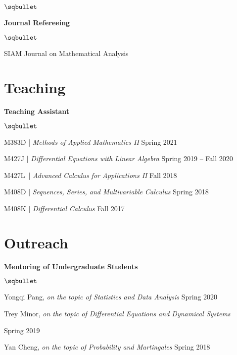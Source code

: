 \documentclass[margin,line]{res}
\newenvironment{list2}{
  \begin{list}{$\sqbullet$}{%
      \setlength{\itemsep}{0.05in}
      \setlength{\parsep}{0in} 
      \setlength{\parskip}{0in}
      \setlength{\topsep}{0.1in} 
      \setlength{\partopsep}{-0.07in} 
      \setlength{\leftmargin}{0.15in}
    }}
{\end{list}}
\begin{document}
\begin{resume}
\begin{list2}
\end{list2}
 
{\bf Journal Refereeing}

\begin{list2}
    \item SIAM Journal on Mathematical Analysis
\end{list2}

\section{\sc Teaching}

{\bf Teaching Assistant}

\begin{list2}
    
    \item M383D \hspace{0.005in}| \textit{Methods of Applied Mathematics II} \hfill Spring 2021
    
    \item M427J \hspace{0.04in}| \textit{Differential Equations with Linear Algebra} \hfill Spring 2019 -- Fall 2020
    
    \item M427L \,| \textit{Advanced Calculus for Applications II} \hfill Fall 2018
    
    \item M408D \hspace{0.002in}| \textit{Sequences, Series, and Multivariable Calculus} \hfill Spring 2018
    
    \item M408K | \textit{Differential Calculus} \hfill Fall 2017
    
\end{list2}

\section{\sc Outreach}

{\bf Mentoring of Undergraduate Students}


\begin{list2}

    \item Yongqi Pang, \textit{on the topic of Statistics and Data Analysis} \hfill Spring 2020
    
    \item Trey Minor, \textit{on the topic of Differential Equations and Dynamical Systems} \\ \strut \hfill Spring 2019
    
    \item Yan Cheng, \textit{on the topic of Probability and Martingales} \hfill Spring 2018
    
\end{list2}

\end{resume}
\end{document}
